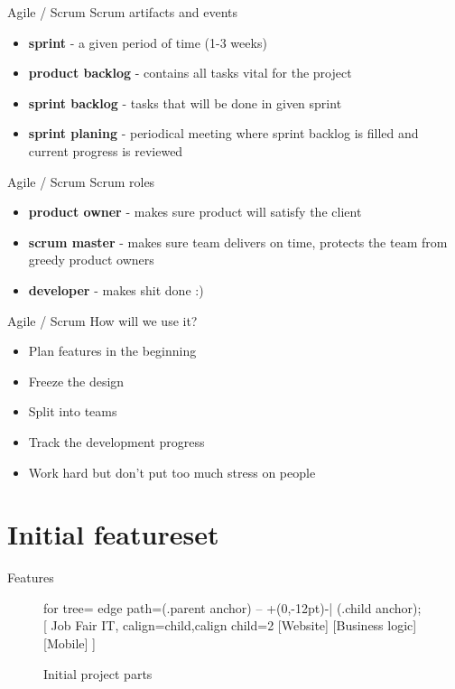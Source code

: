 \documentclass{beamer}
\begin{document}
	\begin{frame}{Agile / Scrum}
		Scrum artifacts and events
		\begin{itemize}
			\item \textbf{sprint} - a given period of time (1-3 weeks)
			\item \textbf{product backlog} - contains all tasks vital for the project
			\item \textbf{sprint backlog} - tasks that will be done in given sprint
			\item \textbf{sprint planing} - periodical meeting where sprint backlog is filled and current progress is reviewed
		\end{itemize}
	\end{frame}

	\begin{frame}{Agile / Scrum}
		Scrum roles
		\begin{itemize}
			\item \textbf{product owner} - makes sure product will satisfy the client
			\item \textbf{scrum master} - makes sure team delivers on time, protects the team from greedy product owners
			\item \textbf{developer} - makes shit done :)
		\end{itemize}
	\end{frame}

	\begin{frame}{Agile / Scrum}
		How will we use it?
		\begin{itemize}
			\item Plan features in the beginning
			\item Freeze the design
			\item Split into teams
			\item Track the development progress
			\item Work hard but don't put too much stress on people
		\end{itemize}
	\end{frame}
	
	\section{Initial featureset}
	
	\begin{frame}{Features}
		\begin{figure}
			\begin{forest}
				for tree={%
				edge path={\noexpand{} (.parent anchor) -- +(0,-12pt)-| (.child anchor);}
				}
				[
				Job Fair IT, calign=child,calign child=2
					[Website]
					[Business logic]
					[Mobile]
				]
			\end{forest}
			\caption{Initial project parts}
		\end{figure}
	\end{frame}
\end{document}
